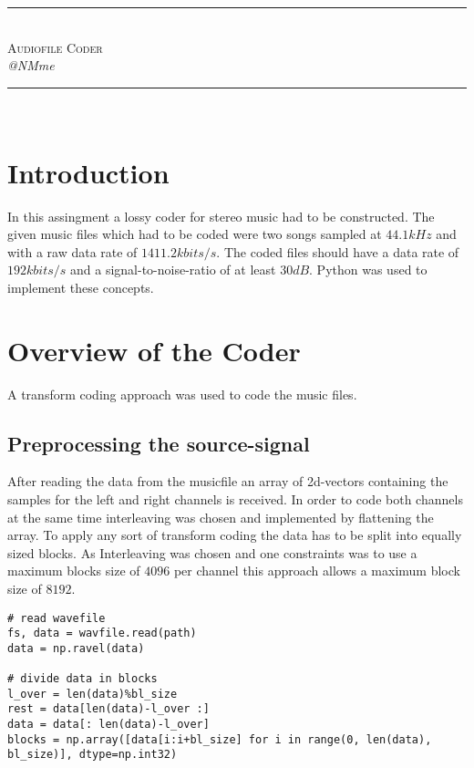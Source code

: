 \documentclass[10pt]{article}
\newcommand{\HRule}{\rule{\linewidth}{0.25mm}}
\begin{document}
\begin{center}

\HRule \\[0.6cm]
{\Large \textsc{Audiofile Coder}}\\[0.4cm]
{\Large \textit{@NMme}}\\[0.1cm]
\HRule \\[0.8cm]

\end{center}

\vspace{2cm}

\newpage

\section{Introduction}
In this assingment a lossy coder for stereo music had to be constructed.
The given music files which had to be coded were two songs sampled at $44.1 kHz$ and with a raw data rate of $1411.2 kbits/s$.
The coded files should have a data rate of $192 kbits/s$ and a signal-to-noise-ratio of at least $30 dB$.
Python was used to implement these concepts.

\section{Overview of the Coder}
A transform coding approach was used to code the music files.

\subsection{Preprocessing the source-signal}
After reading the data from the musicfile an array of 2d-vectors containing the samples for the left and right channels is received. 
In order to code both channels at the same time interleaving was chosen and implemented by flattening the array.
To apply any sort of transform coding the data has to be split into equally sized blocks. 
As Interleaving was chosen and one constraints was to use a maximum blocks size of $4096$ per channel this approach allows a maximum block size of $8192$.

\begin{lstlisting}
# read wavefile
fs, data = wavfile.read(path)
data = np.ravel(data)

# divide data in blocks
l_over = len(data)%bl_size
rest = data[len(data)-l_over :]
data = data[: len(data)-l_over]
blocks = np.array([data[i:i+bl_size] for i in range(0, len(data), bl_size)], dtype=np.int32)
\end{lstlisting}
\end{document}

